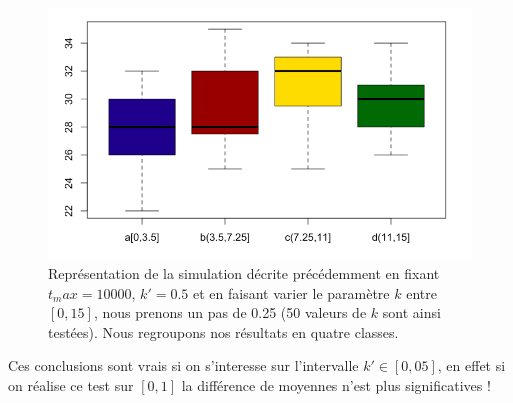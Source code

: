 \documentclass[12pt]{article}
\begin{document}
\begin{minipage}{0.45\textwidth}
\begin{figure}[H]
\includegraphics[width=1\textwidth]{nombre_succes-K_F.png}
\caption{Représentation de la simulation décrite précédemment en fixant $t_max=10000$, $k'=0.5$ et en faisant varier le paramètre $k$ entre $[0,15]$, nous prenons un pas de 0.25 (50 valeurs de $k$ sont ainsi testées). Nous regroupons nos résultats en quatre classes.}
\label{nombreSkf}
\end{figure}
\end{minipage}


Ces conclusions sont vrais si on s'interesse sur l'intervalle $k'\in[0,05]$, en effet si on réalise ce test sur $[0,1]$ la différence de moyennes n'est plus significatives !
\end{document}
